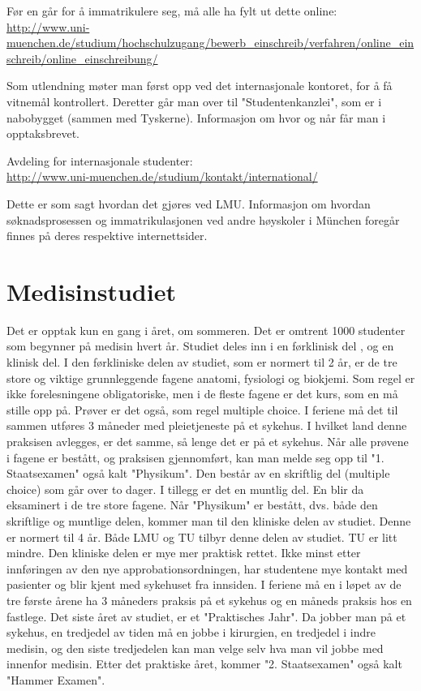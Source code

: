 Før en går for å immatrikulere seg, må alle ha fylt ut dette online:\\
\url{http://www.uni-muenchen.de/studium/hochschulzugang/bewerb_einschreib/verfahren/online_einschreib/online_einschreibung/}

Som utlendning møter man først opp ved det internasjonale kontoret, for å få vitnemål kontrollert. Deretter går man over til "Studentenkanzlei", som er i nabobygget (sammen med Tyskerne). Informasjon om hvor og når får man i opptaksbrevet.

Avdeling for internasjonale studenter:\\
\url{http://www.uni-muenchen.de/studium/kontakt/international/}

Dette er som sagt hvordan det gjøres ved LMU. Informasjon om hvordan søknadsprosessen og immatrikulasjonen ved andre høyskoler i München foregår finnes på deres respektive internettsider.


\section{Medisinstudiet}

Det er opptak kun en gang i året, om sommeren. Det er omtrent 1000 studenter som begynner på medisin hvert år. Studiet deles inn i en førklinisk del , og en klinisk del. I den førkliniske delen av studiet, som er normert til 2 år, er de tre store og viktige grunnleggende fagene anatomi, fysiologi og biokjemi. Som regel er ikke forelesningene obligatoriske, men i de fleste fagene er det kurs, som en må stille opp på. Prøver er det også, som regel multiple choice.
I feriene må det til sammen utføres 3 måneder med pleietjeneste på et sykehus. I hvilket land denne praksisen avlegges, er det samme, så lenge det er på et sykehus. Når alle prøvene i fagene er bestått, og praksisen gjennomført, kan man melde seg opp til "1. Staatsexamen" også kalt "Physikum". Den består av en skriftlig del (multiple choice) som går over to dager. I tillegg er det en muntlig del. En blir da eksaminert i de tre store fagene.
Når "Physikum" er bestått, dvs. både den skriftlige og muntlige delen, kommer man til den kliniske delen av studiet. Denne er normert til 4 år. Både LMU og TU tilbyr denne delen av studiet. TU er litt mindre. Den kliniske delen er mye mer praktisk rettet. Ikke minst etter innføringen av den nye approbationsordningen, har studentene mye kontakt med pasienter og blir kjent med sykehuset fra innsiden. I feriene må en i løpet av de tre første årene ha 3 måneders praksis på et sykehus og en måneds praksis hos en fastlege. Det siste året av studiet, er et "Praktisches Jahr". Da jobber man på et sykehus, en tredjedel av tiden må en jobbe i kirurgien, en tredjedel i indre medisin, og den siste tredjedelen kan man velge selv hva man vil jobbe med innenfor medisin. Etter det praktiske året, kommer "2. Staatsexamen" også kalt "Hammer Examen". 


